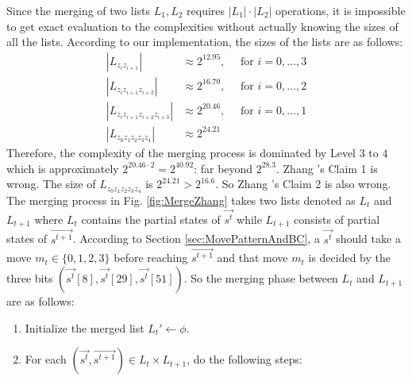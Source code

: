 Since the merging of two lists $L_1,L_2$ requires $|L_1|\cdot |L_2|$ operations, it is impossible to get exact evaluation to the complexities without actually knowing the sizes of all the lists.
According to our implementation, the sizes of the lists are as follows:
\begin{equation}\label{eq:ListSizes}
  \begin{aligned}
  |L_{z_iz_{i+1}}| &\approx 2^{12.95},\quad \text{ for } i=0,\ldots, 3 \\
  |L_{z_iz_{i+1}z_{i+2}}| & \approx 2^{16.70},  \quad \text{ for } i=0,\ldots, 2\\
  |L_{z_iz_{i+1}z_{i+2}z_{i+3}}| & \approx 2^{20.46},  \quad \text{ for } i=0,\ldots, 1\\
  |L_{z_0z_{1}z_{2}z_{3}z_{4}}| & \approx 2^{24.21}
  \end{aligned}
\end{equation}
Therefore, the complexity of the merging process is dominated by Level 3 to 4 which is approximately $2^{20.46\cdot 2}=2^{40.92}$: far beyond $2^{28.3}$.
Zhang \etal's Claim 1 is wrong.
The size of $L_{z_0z_1z_2z_3z_4}$ is $2^{24.21}> 2^{16.6}$.
So Zhang \etal's Claim 2 is also wrong.
The merging process in Fig. \ref{fig:MergeZhang} takes two lists denoted as $L_t$ and $L_{t+1}$ where $L_{t}$ contains the partial states of $\vec{ s^t}$ while $L_{t+1}$ consists of partial states of $\vec{s^{t+1}}$.
According to Section \ref{sec:MovePatternAndBC}, a $\vec{s^t}$ should take a move $m_t\in \{0,1,2,3\}$ before reaching $\vec{s^{t+1}}$ and that move $m_t$ is decided by the three bits $(\vec{s^t}[8],\vec{s^t}[29],\vec{s^t}[51])$.
So the merging phase between $L_t$ and $L_{t+1}$ are as follows:
\begin{enumerate}
  \item Initialize the merged list $L_{t}'\leftarrow \phi$.
  \item For each $(\vec{s^t},\vec{s^{t+1}})\in L_t\times L_{t+1}$, do the following steps:
\end{enumerate}
